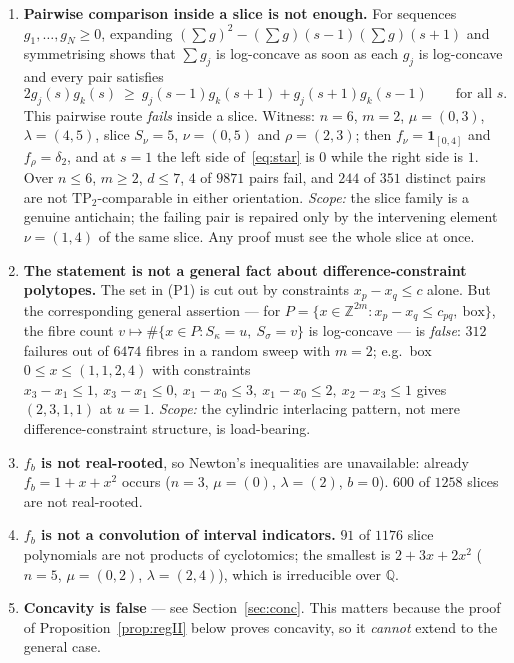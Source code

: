 \documentclass[11pt]{article}
\theoremstyle{plain}
\theoremstyle{definition}
\newcommand{\Z}{\mathbb{Z}}
\begin{document}
\begin{enumerate}
\item\textbf{Pairwise comparison inside a slice is not enough.} For sequences
$g_1,\dots,g_N\ge 0$, expanding $(\sum g)^2-(\sum g)(s-1)(\sum g)(s+1)$ and symmetrising
shows that $\sum g_j$ is log-concave as soon as each $g_j$ is log-concave and every pair
satisfies
\begin{equation}\label{eq:star}
  2g_j(s)g_k(s)\ \ge\ g_j(s-1)g_k(s+1)+g_j(s+1)g_k(s-1)\qquad\text{for all }s. \tag{$*$}
\end{equation}
This pairwise route \emph{fails} inside a slice. Witness: $n=6$, $m=2$, $\mu=(0,3)$,
$\lambda=(4,5)$, slice $S_\nu=5$, $\nu=(0,5)$ and $\rho=(2,3)$; then
$f_\nu=\mathbf 1_{[0,4]}$ and $f_\rho=\delta_2$, and at $s=1$ the left side
of~\eqref{eq:star} is $0$ while the right side is $1$. Over $n\le 6$, $m\ge2$, $d\le 7$,
$4$ of $9871$ pairs fail, and $244$ of $351$ distinct pairs are not $\mathrm{TP}_2$-comparable in
either orientation. \emph{Scope:} the slice family is a genuine antichain; the failing pair
is repaired only by the intervening element $\nu=(1,4)$ of the same slice. Any proof must
see the whole slice at once.

\item\textbf{The statement is not a general fact about difference-constraint polytopes.}
The set in (P1) is cut out by constraints $x_p-x_q\le c$ alone. But the corresponding
general assertion --- for $P=\{x\in\Z^{2m}: x_p-x_q\le c_{pq},\ \text{box}\}$, the fibre
count $v\mapsto\#\{x\in P:S_\kappa=u,\ S_\sigma=v\}$ is log-concave --- is \emph{false}:
$312$ failures out of $6474$ fibres in a random sweep with $m=2$; e.g.\ box
$0\le x\le(1,1,2,4)$ with constraints
$x_3-x_1\le1,\ x_3-x_1\le0,\ x_1-x_0\le3,\ x_1-x_0\le2,\ x_2-x_3\le1$ gives
$(2,3,1,1)$ at $u=1$. \emph{Scope:} the cylindric interlacing pattern, not mere
difference-constraint structure, is load-bearing.

\item\textbf{$f_b$ is not real-rooted}, so Newton's inequalities are unavailable: already
$f_b=1+x+x^2$ occurs ($n=3$, $\mu=(0)$, $\lambda=(2)$, $b=0$). $600$ of $1258$ slices are
not real-rooted.

\item\textbf{$f_b$ is not a convolution of interval indicators.} $91$ of $1176$ slice
polynomials are not products of cyclotomics; the smallest is $2+3x+2x^2$
($n=5$, $\mu=(0,2)$, $\lambda=(2,4)$), which is irreducible over $\mathbb Q$.

\item\textbf{Concavity is false} --- see Section~\ref{sec:conc}. This matters because the
proof of Proposition~\ref{prop:regII} below proves concavity, so it \emph{cannot} extend
to the general case.
\end{enumerate}
\end{document}
